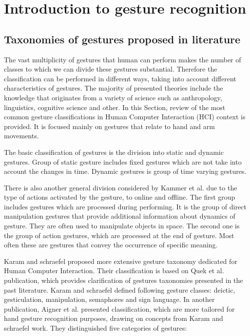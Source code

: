 \chapter{Introduction to gesture recognition}\label{introGRChapter}

\section{Taxonomies of gestures proposed in literature}
The vast multiplicity of gestures that human can perform makes the number of classes to which we can divide these gestures substantial. Therefore the classification can be performed in different ways, taking into account different characteristics of gestures. The majority of presented theories include the knowledge that originates from a variety of science such as anthropology, linguistics, cognitive science and other. In this Section, review of the most common gesture classifications in Human Computer Interaction (HCI) context is provided. It is focused mainly on gestures that relate to hand and arm movements.

The basic classification of gestures is the division into static and dynamic gestures. Group of static gesture includes fixed gestures which are not take into account the changes in time. Dynamic gestures is group of time varying gestures.

There is also another general division considered by Kammer et al. \cite{kammer_taxonomy_2010} due to the type of actions activated by the gesture, to online and offline. The first group includes gestures which are processed during performing. It is the group of direct manipulation gestures that provide additional information about dynamics of gesture. They are often used to manipulate objects in space. The second one is the group of action gestures, which are processed at the end of gesture. Most often these are gestures that convey the occurrence of specific meaning.

Karam and schraefel \cite{Karam05ataxonomy} proposed more extensive gesture taxonomy dedicated for Human Computer Interaction. Their classification is based on Quek et al. \cite{Quek:2002:MHD:568513.568514} publication, which provides clarification of gestures taxonomies presented in the past literature. Karam and schraefel defined following gesture classes: deictic, gesticulation, manipulation, semaphores and sign language. In another publication, Aigner et al. \cite{AignerTaxonomy} presented classification, which are more tailored for hand gesture recognition purposes, drawing on concepts from Karam and schraefel work. They distinguished five categories of gestures:

